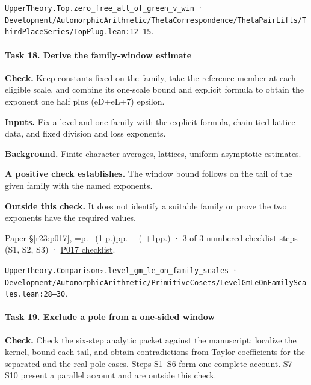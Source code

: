 \nolinkurl{UpperTheory.Top.zero_free_all_of_green_v_win} · \nolinkurl{Development/AutomorphicArithmetic/ThetaCorrespondence/ThetaPairLifts/ThirdPlaceSeries/TopPlug.lean:12–15}.

\paragraph{Task 18. Derive the family-window estimate}\label{v7:task-18}

\textbf{Check.} Keep constants fixed on the family, take the reference member at each eligible scale, and combine its one-scale bound and explicit formula to obtain the exponent one half plus (eD+eL+7) epsilon.

\textbf{Inputs.} Fix a level and one family with the explicit formula, chain-tied lattice data, and fixed division and loss exponents.

\textbf{Background.} Finite character averages, lattices, uniform asymptotic estimates.

\textbf{A positive check establishes.} The window bound follows on the tail of the given family with the named exponents.

\textbf{Outside this check.} It does not identify a suitable family or prove the two exponents have the required values.

Paper \S\ref{r23:p017}, \ifnum{}=\relax p.\ \pageref{r23:family} (1 p.)\else pp.\ \pageref{r23:family}--\pageref{r23:budget} (\number\numexpr{}-+1\relax pp.)\fi{} · 3 of 3 numbered checklist steps (S1, S2, S3) · \href{https://github.com/GunheeC/rh-lean-verification-atlas/blob/v0.1.0/units/P017.check.md}{P017 checklist}.

\nolinkurl{UpperTheory.Comparison₂.level_gm_le_on_family_scales} · \nolinkurl{Development/AutomorphicArithmetic/PrimitiveCosets/LevelGmLeOnFamilyScales.lean:28–30}.

\paragraph{Task 19. Exclude a pole from a one-sided window}\label{v7:task-19}

\textbf{Check.} Check the six-step analytic packet against the manuscript: localize the kernel, bound each tail, and obtain contradictions from Taylor coefficients for the separated and the real pole cases. Steps S1–S6 form one complete account. S7–S10 present a parallel account and are outside this check.

